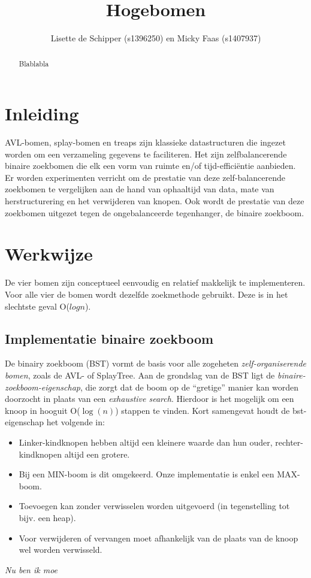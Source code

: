 \documentclass[a4paper,10pt]{article}
\title{ Hogebomen }
\author{ Lisette de Schipper (s1396250) en Micky Faas (s1407937) }
\date{}
\begin{document}
\maketitle

\begin{abstract}
Blablabla
\end{abstract}

\section{Inleiding}
AVL-bomen, splay-bomen en treaps zijn klassieke datastructuren die ingezet worden om een verzameling gegevens te faciliteren. Het zijn zelfbalancerende binaire zoekbomen die elk een vorm van ruimte en/of tijd-effici\"entie aanbieden. Er worden experimenten verricht om de prestatie van deze zelf-balancerende zoekbomen te vergelijken aan de hand van ophaaltijd van data, mate van herstructurering en het verwijderen van knopen. Ook wordt de prestatie van deze zoekbomen uitgezet tegen de ongebalanceerde tegenhanger, de binaire zoekboom.

\section{Werkwijze}
De vier bomen zijn conceptueel eenvoudig en relatief makkelijk te implementeren. Voor alle vier de bomen wordt dezelfde zoekmethode gebruikt. Deze is in het slechtste geval O($logn$).
\subsection{Implementatie binaire zoekboom}

De binairy zoekboom (BST) vormt de basis voor alle zogeheten \emph{zelf-organiserende bomen}, zoals de AVL- of SplayTree.
Aan de grondslag van de BST ligt de \emph{binaire-zoekboom-eigenschap}, die zorgt dat de boom op de ``gretige'' manier kan
worden doorzocht in plaats van een \emph{exhaustive search}. Hierdoor is het mogelijk om een knoop in hooguit O($\log(n)$) stappen te vinden. Kort samengevat houdt de bst-eigenschap het volgende in:
\begin{itemize}
\item Linker-kindknopen hebben altijd een kleinere waarde dan hun ouder, rechter-kindknopen altijd een grotere.
\item Bij een MIN-boom is dit omgekeerd. Onze implementatie is enkel een MAX-boom.
\item Toevoegen kan zonder verwisselen worden uitgevoerd (in tegenstelling tot bijv. een heap).
\item Voor verwijderen of vervangen moet afhankelijk van de plaats van de knoop wel worden verwisseld.
\end{itemize}
\emph{Nu ben ik moe}
\end{document}
